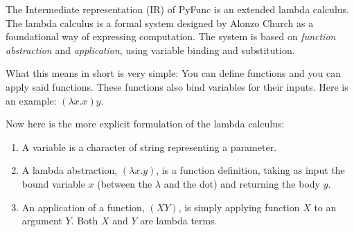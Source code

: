 \documentclass{l4proj}
\begin{document}
The Intermediate representation (IR) of PyFunc is an extended lambda calculus. 
%
The lambda calculus is a formal system designed by Alonzo Church\citep{Church_1932} as a foundational way of expressing computation.
The system is based on \emph{function abstraction} and \emph{application}, using variable binding and substitution.

What this means in short is very simple: You can define functions and you can apply said functions.
These functions also bind variables for their inputs.
Here is an example: $(\lambda x . x) y$.



Now here is the more explicit formulation of the lambda calculus:
\begin{enumerate}
    \item A variable is a character of string representing a parameter. 
    \item A lambda abstraction, $(\lambda x . y)$, is a function definition, taking as input the bound variable $x$ (between the $\lambda$ and the dot) and returning the body $y$.
    \item An application of a function, $(X Y)$, is simply applying function $X$ to an argument $Y$. Both $X$ and $Y$ are lambda terms.
\end{enumerate}
\end{document}
